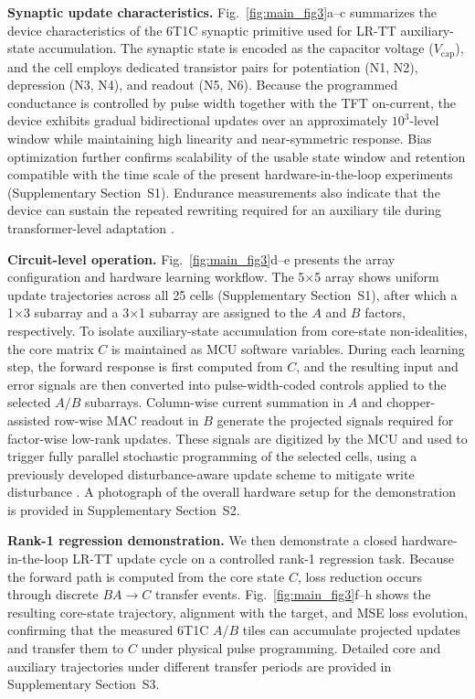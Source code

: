 \documentclass[fleqn,10pt]{wlscirep}
\begin{document}
\noindent\textbf{Synaptic update characteristics.}
Fig.~\ref{fig:main_fig3}a--c summarizes the device characteristics of the 6T1C synaptic primitive used for LR-TT auxiliary-state accumulation. The synaptic state is encoded as the capacitor voltage ($V_{\mathrm{cap}}$), and the cell employs dedicated transistor pairs for potentiation (N1, N2), depression (N3, N4), and readout (N5, N6). Because the programmed conductance is controlled by pulse width together with the TFT on-current, the device exhibits gradual bidirectional updates over an approximately $10^{3}$-level window while maintaining high linearity and near-symmetric response. Bias optimization further confirms scalability of the usable state window and retention compatible with the time scale of the present hardware-in-the-loop experiments (Supplementary Section~S1). Endurance measurements also indicate that the device can sustain the repeated rewriting required for an auxiliary tile during transformer-level adaptation \cite{ambrogio2018analogtraining,li2018insitu,legallo2018mixedprecision,mackin2022weightprogramming,won2023advs_6t1c,kang2025advs_disturbance}.

\noindent\textbf{Circuit-level operation.}
Fig.~\ref{fig:main_fig3}d--e presents the array configuration and hardware learning workflow. The 5$\times$5 array shows uniform update trajectories across all 25 cells (Supplementary Section~S1), after which a 1$\times$3 subarray and a 3$\times$1 subarray are assigned to the $A$ and $B$ factors, respectively. To isolate auxiliary-state accumulation from core-state non-idealities, the core matrix $C$ is maintained as MCU software variables. During each learning step, the forward response is first computed from $C$, and the resulting input and error signals are then converted into pulse-width-coded controls applied to the selected $A/B$ subarrays. Column-wise current summation in $A$ and chopper-assisted row-wise MAC readout in $B$ generate the projected signals required for factor-wise low-rank updates. These signals are digitized by the MCU and used to trigger fully parallel stochastic programming of the selected cells, using a previously developed disturbance-aware update scheme to mitigate write disturbance \cite{won2023advs_6t1c,kang2025advs_disturbance}. A photograph of the overall hardware setup for the demonstration is provided in Supplementary Section~S2.

\noindent\textbf{Rank-1 regression demonstration.}
We then demonstrate a closed hardware-in-the-loop LR-TT update cycle on a controlled rank-1 regression task.
Because the forward path is computed from the core state \(C\),
loss reduction occurs through discrete \(BA\!\rightarrow C\) transfer events.
Fig.~\ref{fig:main_fig3}f--h shows the resulting core-state trajectory, alignment with the target, and MSE loss evolution, confirming that the measured 6T1C \(A/B\) tiles can accumulate projected updates and transfer them to \(C\) under physical pulse programming.
Detailed core and auxiliary trajectories under different transfer periods are provided in Supplementary Section~S3.
\end{document}
